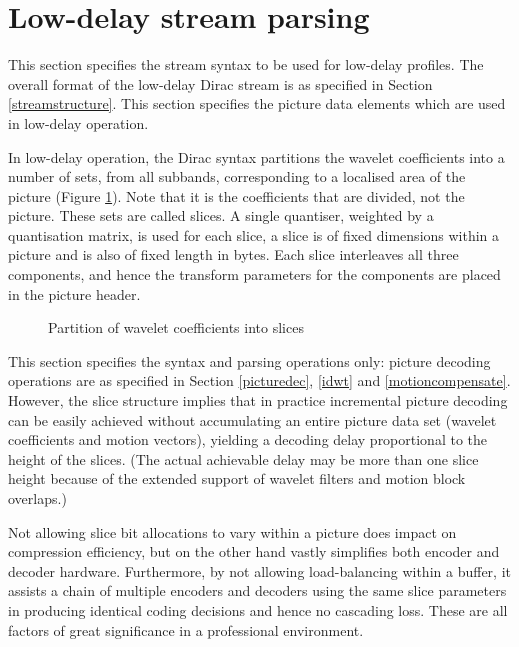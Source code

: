 \section{Low-delay stream parsing}
\label{lowdelayparsing}

This section specifies the stream syntax to be used for low-delay profiles.
The overall format of the low-delay Dirac stream is as specified in Section \ref{streamstructure}. This section
specifies the picture data elements which are used in low-delay operation. 

In low-delay operation, the Dirac syntax partitions the wavelet coefficients into a number of sets,
from all subbands, corresponding to a localised area of the picture (Figure \ref{fig:waveletslice}).
 Note that it is the coefficients that are divided,
not the picture. These sets are called slices. A single quantiser, weighted by a quantisation matrix, is used for each slice, 
a slice is  of fixed dimensions within a picture and is also of fixed length in bytes. Each slice interleaves all three components, and hence
the transform parameters for the components are placed in the picture header.

\begin{figure}[!ht]
\centering
\caption{Partition of wavelet coefficients into slices}
\label{fig:waveletslice}
\end{figure}

This section specifies the syntax and parsing operations only: picture decoding operations are as
specified in Section \ref{picturedec}, \ref{idwt} and \ref{motioncompensate}. However, the slice
structure implies that in practice incremental picture decoding can be easily achieved without
accumulating an entire picture data set (wavelet coefficients and motion vectors), yielding a decoding delay
proportional to the height of the slices. (The actual achievable delay may be more than one slice height because
of the extended support of wavelet filters and motion block overlaps.)

\begin{informative}
Not allowing slice bit allocations to vary within a picture does impact on
compression efficiency, but on the other hand vastly simplifies both encoder and decoder hardware. Furthermore, by
not allowing load-balancing within a buffer, it assists a chain of multiple encoders and decoders using the same
slice parameters in producing identical coding decisions and hence no cascading loss. These are all factors of great 
significance in a professional environment.
\end{informative}

